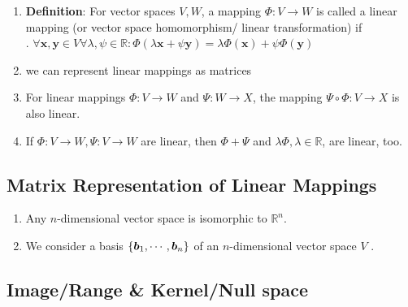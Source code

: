 \begin{enumerate}
    \item \textbf{Definition}: For vector spaces $V, W$, a mapping $\Phi : V \to W$ is called a linear mapping (or vector space homomorphism/ linear transformation) if
    \hfill \cite{mfml/book/mml/Deisenroth-Faisal-Ong}
    \\
    .\hfill
    $
        \forall \bm{x}, \bm{y} \in V \forall \lambda , \psi  \in \mathbb{R} : 
        \Phi(\lambda \bm{x} + \psi \bm{y}) = \lambda \Phi(\bm{x}) + \psi \Phi(\bm{y})
    $
    \hfill \cite{mfml/book/mml/Deisenroth-Faisal-Ong}

    \item we can represent linear mappings as matrices
    \hfill \cite{mfml/book/mml/Deisenroth-Faisal-Ong}

    \item For linear mappings $\Phi : V \to W$ and $\Psi : W \to X$, the mapping $\Psi \circ \Phi : V \to X$ is also linear.
    \hfill \cite{mfml/book/mml/Deisenroth-Faisal-Ong}

    \item If $\Phi : V \to W, \Psi : V \to W$ are linear, then $\Phi + \Psi$ and $\lambda\Phi, \lambda \in \mathbb{R}$, are linear, too.
    \hfill \cite{mfml/book/mml/Deisenroth-Faisal-Ong}
\end{enumerate}



\subsection{Matrix Representation of Linear Mappings}

\begin{enumerate}
    \item Any $n$-dimensional vector space is isomorphic to $\mathbb{R}^n$.
    \hfill \cite{mfml/book/mml/Deisenroth-Faisal-Ong}

    \item We consider a basis $\left\{\bm{b}_1, \cdots , \bm{b}_n\right\}$ of an $n$-dimensional vector space $V$ .
    \hfill \cite{mfml/book/mml/Deisenroth-Faisal-Ong}
\end{enumerate}




\subsection{Image/Range \& Kernel/Null space}

